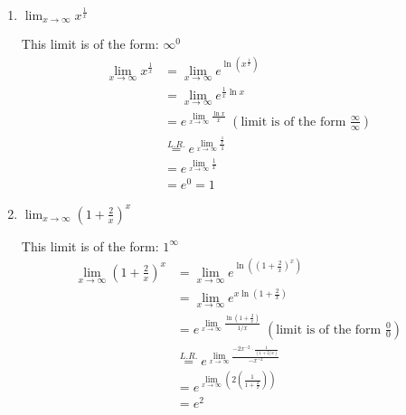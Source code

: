 \documentclass[nooutcomes,handout]{ximera}
\begin{document}
\begin{problem}
\begin{enumerate}
    
    
  \item  $\lim_{x \to \infty} x^{\frac{1}{x}} $
    \begin{freeResponse}
    This limit is of the form: $\infty^0$
      \begin{align*}
        \lim_{x \to \infty} x^{\frac{1}{x}} &= \lim_{x \to \infty} e^{\ln \left( x^{\frac{1}{x}} \right) } \\
                                            &= \lim_{x \to \infty} e^{\frac{1}{x} \ln x } \\
                                            &= e^{ \lim_{x \to \infty} \frac{\ln x}{x} } \; \left( \text{limit is of the form } \frac{\infty}{\infty} \right) \\
                                            &\stackrel{L.R.}{=} e^{\lim_{x \to \infty}\frac{\frac{1}{x}}{1}} \\
                                            &= e^{\lim_{x \to \infty} \frac{1}{x}} \\
                                            &= e^0 = 1
      \end{align*}
    \end{freeResponse}
    
    \item $\lim_{x \to \infty} \left(1+\frac{2}{x}\right)^x$
        \begin{freeResponse}
    This limit is of the form: $1^\infty$
     \begin{align*}
        \lim_{x \to \infty} \left(1+\frac{2}{x}\right)^x &= \lim_{x \to \infty} e^{\ln \left(\left(1+\frac{2}{x}\right)^x \right) } \\
                                            &= \lim_{x \to \infty} e^{x \ln \left(1+\frac{2}{x}\right) } \\
                                            &= e^{ \lim_{x \to \infty} \frac{\ln \left(1+\frac{2}{x}\right)}{1/x} } \; \left( \text{limit is of the form } \frac{0}{0} \right) \\
                                            &\stackrel{L.R.}{=} e^{\lim_{x \to \infty}\frac{-2x^{-2}\cdot \frac{1}{(1+2/x)}}{-x^{-2}}} \\
                                            &= e^{\lim_{x \to \infty} \left(2\left(\frac{1}{1+\frac{2}{x}}\right)\right)} \\
                                            &= e^2 
        \end{align*}
    \end{freeResponse}
    

\end{enumerate}
\end{problem}
\end{document}
